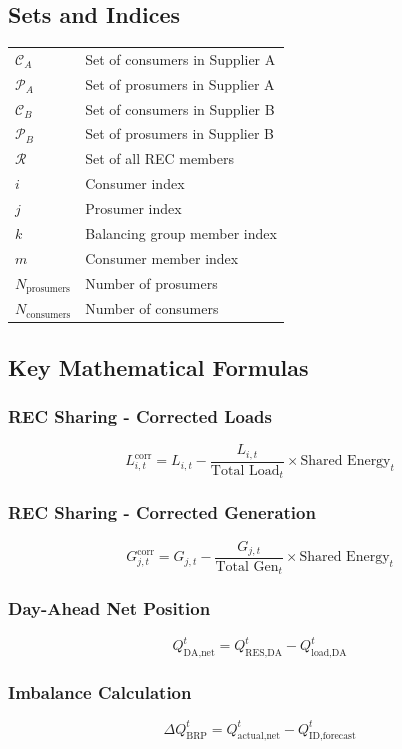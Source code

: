 \subsection{Sets and Indices}

\begin{tabular}{ll}
$\mathcal{C}_A$ & Set of consumers in Supplier A \\
$\mathcal{P}_A$ & Set of prosumers in Supplier A \\
$\mathcal{C}_B$ & Set of consumers in Supplier B \\
$\mathcal{P}_B$ & Set of prosumers in Supplier B \\
$\mathcal{R}$ & Set of all REC members \\
$i$ & Consumer index \\
$j$ & Prosumer index \\
$k$ & Balancing group member index \\
$m$ & Consumer member index \\
$N_{\text{prosumers}}$ & Number of prosumers \\
$N_{\text{consumers}}$ & Number of consumers \\
\end{tabular}

\subsection{Key Mathematical Formulas}

\subsubsection{REC Sharing - Corrected Loads}
$$L_{i,t}^{\text{corr}} = L_{i,t} - \frac{L_{i,t}}{\text{Total Load}_t} \times \text{Shared Energy}_t$$

\subsubsection{REC Sharing - Corrected Generation}
$$G_{j,t}^{\text{corr}} = G_{j,t} - \frac{G_{j,t}}{\text{Total Gen}_t} \times \text{Shared Energy}_t$$

\subsubsection{Day-Ahead Net Position}
$$Q_{\text{DA,net}}^{t} = Q_{\text{RES,DA}}^{t} - Q_{\text{load,DA}}^{t}$$

\subsubsection{Imbalance Calculation}
$$\Delta Q_{\text{BRP}}^{t} = Q_{\text{actual,net}}^{t} - Q_{\text{ID,forecast}}^{t}$$


